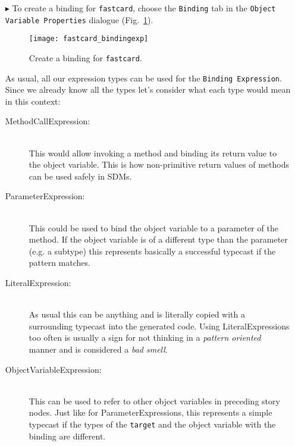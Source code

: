 \begin{itemize}
  
\item[$\blacktriangleright$] To create a binding for \texttt{fastcard}, choose the \texttt{Binding} tab in the \texttt{Object Variable Properties} dialogue (Fig.~\ref{fig:sdm_fastcard_3}).

\begin{figure}[htbp]
\begin{center}
  \texttt{[image: fastcard\_bindingexp]}
  \caption{Create a binding for \texttt{fastcard}.}  
  \label{fig:sdm_fastcard_3}
\end{center}
\end{figure}

As usual, all our expression types can be used for the \texttt{Binding Expression}.  
Since we already know all the types let's consider what each type would mean in this context: 
\begin{description}
  \item[MethodCallExpression:]~\\ This would allow invoking a method and binding
  its return value to the object variable.  This is how non-primitive return
  values of methods can be used safely in SDMs.
  
  \item[ParameterExpression:]~\\ This could be used to bind the object variable
  to a parameter of the method.  If the object variable is of a different type
  than the parameter (e.g. a subtype) this represents basically a successful
  typecast if the pattern matches.
  
  \item[LiteralExpression:]~\\ As usual this can be anything and is literally
  copied with a surrounding typecast into the generated code.  Using
  LiteralExpressions too often is usually a sign for not thinking in a
  \emph{pattern oriented} manner and is considered a \emph{bad smell}.

  
  \item[ObjectVariableExpression:]~\\ This can be used to refer to other object
  variables in preceding story nodes.  Just like for ParameterExpressions, this
  represents a simple typecast if the types of the \texttt{target} and the
  object variable with the binding are different.
\end{description}


\end{itemize}
